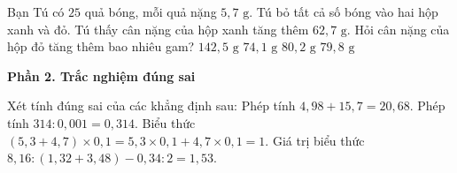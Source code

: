 \begin{ex} %
Bạn Tú có $25$ quả bóng, mỗi quả nặng $5{,}7\text{ g}$. Tú bỏ tất cả số bóng vào hai hộp xanh và đỏ. Tú thấy cân nặng của hộp xanh tăng thêm $62{,}7\text{ g}$. Hỏi cân nặng của hộp đỏ tăng thêm bao nhiêu gam?
\choice
{$142{,}5\text{ g}$}
{$74{,}1\text{ g}$}
{$80{,}2\text{ g}$}
{\True $79{,}8\text{ g}$}
\end{ex}

\textbf{Phần 2. Trắc nghiệm đúng sai}

\begin{ex} %
Xét tính đúng sai của các khẳng định sau:
\choiceTF
{\True Phép tính $4{,}98 + 15{,}7 = 20{,}68$.}
{Phép tính $314 : 0{,}001 = 0{,}314$.}
{\True Biểu thức $(5{,}3 + 4{,}7) \times 0{,}1 = 5{,}3 \times 0{,}1 + 4{,}7 \times 0{,}1 = 1$.}
{\True Giá trị biểu thức $8{,}16 : (1{,}32 + 3{,}48) - 0{,}34 : 2 = 1{,}53$.}
\end{ex}

